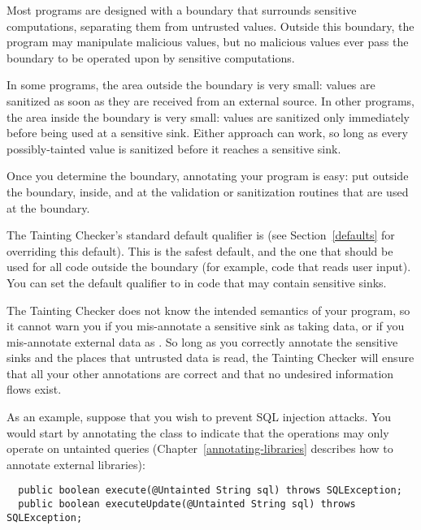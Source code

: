 
Most programs are designed with a boundary that surrounds sensitive
computations, separating them from untrusted values.  Outside this
boundary, the program may manipulate malicious values, but no malicious
values ever pass the boundary to be operated upon by sensitive
computations.

In some programs, the area outside the boundary is very small:  values are
sanitized as soon as they are received from an external source.  In other
programs, the area inside the boundary is very small:  values are sanitized
only immediately before being used at a sensitive sink.  Either approach
can work, so long as every possibly-tainted value is sanitized before it
reaches a sensitive sink.

Once you determine the boundary, annotating your program is easy:  put
 outside the boundary,  inside, and
 at the validation or
sanitization routines that are used at the boundary.

The Tainting Checker's standard default qualifier is  (see
Section~\ref{defaults} for overriding this default).  This is the safest
default, and the one that should be used for all code outside the boundary
(for example, code that reads user input).  You can set the default
qualifier to  in code that may contain sensitive sinks.

The Tainting Checker does not know the intended semantics of your program,
so it cannot warn you if you mis-annotate a sensitive sink as taking
 data, or if you mis-annotate external data as
.  So long as you correctly annotate the sensitive sinks
and the places that untrusted data is read, the Tainting Checker will
ensure that all your other annotations are correct and that no undesired
information flows exist.

As an example, suppose that you wish to prevent SQL injection attacks.  You
would start by annotating the
 class to indicate that the
 operations may only operate on untainted queries
(Chapter~\ref{annotating-libraries} describes how to annotate external
libraries):

\begin{Verbatim}
  public boolean execute(@Untainted String sql) throws SQLException;
  public boolean executeUpdate(@Untainted String sql) throws SQLException;
\end{Verbatim}


